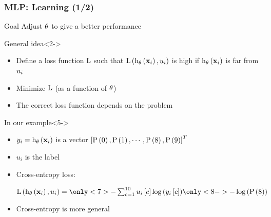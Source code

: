 \begin{frame}
  \frametitle{\acl{MLP}: Learning (1/2)}

  \begin{block}{Goal}
    Adjust $\mathbf{\theta}$ to give a better performance
  \end{block}

  \begin{block}{General idea}<2->
    \begin{itemize}
    \item<2-> Define a loss function $\mathrm{L}$ such that $\mathrm{L} \left ( {
            \mathrm{h}_{\mathbf{\theta}} \left ( {\mathbf{x}_i} \right ),
            u_i
          } \right )$ is high if $\mathrm{h}_{\mathbf{\theta}} \left ( {\mathbf{x}_i} \right )$ is far from
          $u_i$
     \item<3-> Minimize $\mathrm{L}$ (as a function of $\mathbf{\theta}$)
     \item<4-> The correct loss function depends on the problem
    \end{itemize}
  \end{block}

  \begin{block}{In our example}<5->
    \begin{itemize}
    \item $y_i = \mathrm{h}_{\mathbf{\theta}} \left ( {\mathbf{x}_i} \right )$ is a vector $\left [ {\mathrm{P} \left ( {0} \right ), \mathrm{P} \left ( {1} \right ), \cdots,
        \mathrm{P} \left ( {8} \right ), \mathrm{P} \left ( {9} \right )} \right ]^T$
    \item $u_i$ is the label 
  \item<7-> Cross-entropy loss:
    \begin{center}
      $
        \apply{\lossFunc}{\apply{\hyp_\params}{\example_i},
          \knownLabel_i} = \only<7>{- \sum_{c=1}^{10} \vectorElem{u_i}{c}
          \apply{\log}{\vectorElem{\predLabel_i}{c}}}
                           \only<8->{- \apply{\log}{\prob{8}}}
      $
    \end{center}
    \item<9-> Cross-entropy is more general
    \end{itemize}
  \end{block}
\end{frame}



